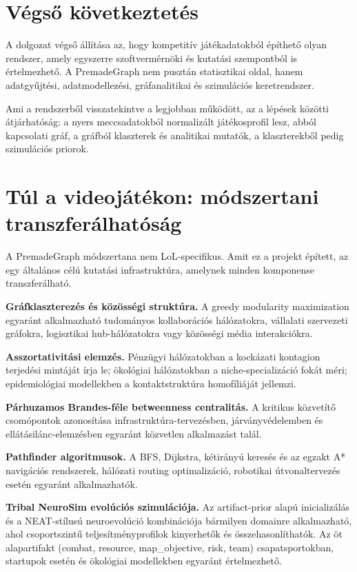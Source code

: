 \section{Végső következtetés}

A dolgozat végső állítása az, hogy kompetitív játékadatokból építhető olyan rendszer, amely egyszerre szoftvermérnöki és kutatási szempontból is értelmezhető. A PremadeGraph nem pusztán statisztikai oldal, hanem adatgyűjtési, adatmodellezési, gráfanalitikai és szimulációs keretrendszer.

Ami a rendszerből visszatekintve a legjobban működött, az a lépések közötti átjárhatóság: a nyers meccsadatokból normalizált játékosprofil lesz, abból kapcsolati gráf, a gráfból klaszterek és analitikai mutatók, a klaszterekből pedig szimulációs priorok.

\section{Túl a videojátékon: módszertani transzferálhatóság}
\label{sec:osszegzes-transfer}

A PremadeGraph módszertana nem LoL-specifikus. Amit ez a projekt épített, az egy általános célú kutatási infrastruktúra, amelynek minden komponense transzferálható.

\textbf{Gráfklaszterezés és közösségi struktúra.} A greedy modularity maximization egyaránt alkalmazható tudományos kollaborációs hálózatokra, vállalati szervezeti gráfokra, logisztikai hub-hálózatokra vagy közösségi média interakciókra.

\textbf{Asszortativitási elemzés.} Pénzügyi hálózatokban a kockázati kontagion terjedési mintáját írja le; ökológiai hálózatokban a niche-specializáció fokát méri; epidemiológiai modellekben a kontaktstruktúra homofíliáját jellemzi.

\textbf{Párhuzamos Brandes-féle betweenness centralitás.} A kritikus közvetítő csomópontok azonosítása infrastruktúra-tervezésben, járványvédelemben és ellátásilánc-elemzésben egyaránt közvetlen alkalmazást talál.

\textbf{Pathfinder algoritmusok.} A BFS, Dijkstra, kétirányú keresés és az egzakt A* navigációs rendszerek, hálózati routing optimalizáció, robotikai útvonaltervezés esetén egyaránt alkalmazhatók.

\textbf{Tribal NeuroSim evolúciós szimulációja.} Az artifact-prior alapú inicializálás és a NEAT-stílusú neuroevolúció kombinációja bármilyen domainre alkalmazható, ahol csoportszintű teljesítményprofilok kinyerhetők és összehasonlíthatók. Az öt alapartifakt (combat, resource, map\_objective, risk, team) csapatsportokban, startupok esetén és ökológiai modellekben egyaránt értelmezhető.

